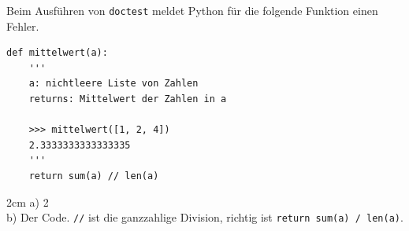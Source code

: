 \question[3]
Beim Ausführen von \texttt{doctest} meldet Python für die folgende Funktion einen Fehler.
\begin{lstlisting}
def mittelwert(a):
    '''
    a: nichtleere Liste von Zahlen
    returns: Mittelwert der Zahlen in a

    >>> mittelwert([1, 2, 4])
    2.3333333333333335
    '''
    return sum(a) // len(a)
\end{lstlisting}
\begin{solutionbox}{2cm}
a) 2 \\
b) Der Code. \texttt{//} ist die ganzzahlige Division, richtig ist \texttt{return sum(a) / len(a)}.
\end{solutionbox}
